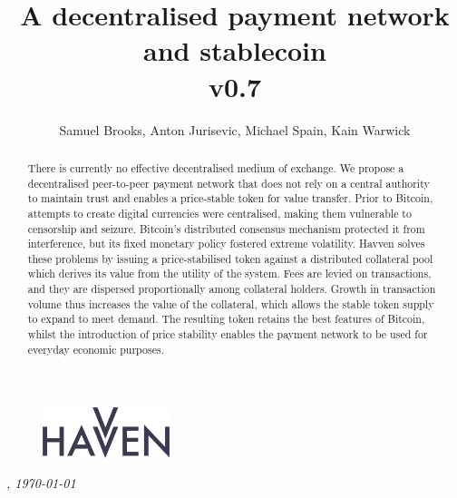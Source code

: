 \documentclass{article}
\theoremstyle{definition}
\theoremstyle{plain} %
\begin{document}
\newcommand{\HAV}{\textsc{hav}}
\newcommand{\NOM}{\textsc{nom}}


\title{A decentralised payment network and stablecoin\\ v0.7}
\author{Samuel Brooks, Anton Jurisevic, Michael Spain, Kain Warwick}
\date{}

\begin{figure}
    \centering
    \includegraphics[width=0.33\textwidth]{img/havvenlogo}
\end{figure}
\maketitle

\hfill

\begin{abstract}
\noindent There is currently no effective decentralised medium of exchange. We propose a decentralised peer-to-peer payment network that does not rely on a central authority to maintain trust and enables a price-stable token for value transfer. Prior to Bitcoin, attempts to create digital currencies were centralised, making them vulnerable to censorship and seizure. Bitcoin’s distributed consensus mechanism protected it from interference, but its fixed monetary policy fostered extreme volatility. Havven solves these problems by issuing a price-stabilised token against a distributed collateral pool which derives its value from the utility of the system. Fees are levied on transactions, and they are dispersed proportionally among collateral holders. Growth in transaction volume thus increases the value of the collateral, which allows the stable token supply to expand to meet demand. The resulting token retains the best features of Bitcoin, whilst the introduction of price stability enables the payment network to be used for everyday economic purposes.
\end{abstract}	
\vspace{20mm}
\begin{center}
  \small{\textit{\currenttime , \today}}
\end{center}


\pagebreak 
\end{document}
